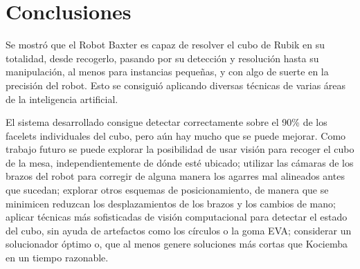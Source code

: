 \chapter{Conclusiones}

Se mostró que el Robot Baxter es capaz de resolver el cubo de Rubik en su totalidad, desde recogerlo, pasando por su detección y resolución hasta su manipulación, al menos para instancias pequeñas, y con algo de suerte en la precisión del robot. Esto se consiguió aplicando diversas técnicas de varias áreas de la inteligencia artificial.

El sistema desarrollado consigue detectar correctamente sobre el 90\% de los facelets individuales del cubo, pero aún hay mucho que se puede mejorar. Como trabajo futuro se puede explorar la posibilidad de usar visión para recoger el cubo de la mesa, independientemente de dónde esté ubicado; utilizar las cámaras de los brazos del robot para corregir de alguna manera los agarres mal alineados antes que sucedan; explorar otros esquemas de posicionamiento, de manera que se minimicen reduzcan los desplazamientos de los brazos y los cambios de mano; aplicar técnicas más sofisticadas de visión computacional para detectar el estado del cubo, sin ayuda de artefactos como los círculos o la goma EVA; considerar un solucionador óptimo o, que al menos genere soluciones más cortas que Kociemba en un tiempo razonable.
